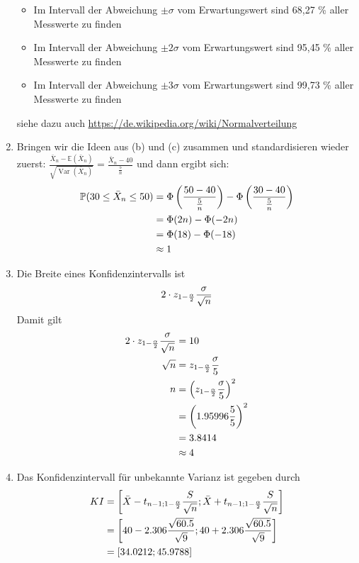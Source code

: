 \documentclass{article}
\newcommand{\E}{\mathbb{E}}
\DeclareMathOperator{\Var}{Var}
\begin{document}
\begin{enumerate}[label=(\alph*)]
\begin{itemize}
			\item Im Intervall der Abweichung $\pm\sigma$ vom Erwartungswert sind 68,27 \% aller Messwerte zu finden
			\item Im Intervall der Abweichung $\pm2\sigma$ vom Erwartungswert sind 95,45 \% aller Messwerte zu finden
			\item Im Intervall der Abweichung $\pm3\sigma$ vom Erwartungswert sind 99,73 \% aller Messwerte zu finden
		\end{itemize}
		siehe dazu auch \url{https://de.wikipedia.org/wiki/Normalverteilung}
		\item Bringen wir die Ideen aus (b) und (c) zusammen und standardisieren wieder zuerst: $\frac{\bar{X}_n-\E(\bar{X}_n)}{\sqrt{\Var(\bar{X}_n)}} = \frac{\bar{X}_n-40}{\frac{5}{n}}$ und dann ergibt sich:
		\begin{align}
			\mathbb{P}(30 \le \bar{X}_n \le 50) &= \Phi\left(\frac{50-40}{\frac{5}{n}}\right) - \Phi\left(\frac{30-40}{\frac{5}{n}}\right) \notag \\
			&= \Phi(2n) - \Phi(-2n) \notag \\
			&= \Phi(18) - \Phi(-18) \notag \\
			&\approx 1 \notag
		\end{align}
		\item Die Breite eines Konfidenzintervalls ist
		\begin{align}
			2\cdot z_{1-\frac{\alpha}{2}}\frac{\sigma}{\sqrt{n}} \notag
		\end{align}
		Damit gilt
		\begin{align}
			2\cdot z_{1-\frac{\alpha}{2}}\frac{\sigma}{\sqrt{n}} &= 10 \notag \\
			\sqrt{n} &= z_{1-\frac{\alpha}{2}}\frac{\sigma}{5} \notag \\
			n &= \left(z_{1-\frac{\alpha}{2}}\frac{\sigma}{5}\right)^2 \notag \\
			&= \left(1.95996\frac{5}{5}\right)^2 \notag \\
			&= 3.8414 \notag \\
			&\approx 4 \notag
		\end{align}
		\item Das Konfidenzintervall für unbekannte Varianz ist gegeben durch
		\begin{align}
			KI &= \left[\bar{X} - t_{n-1;1-\frac{\alpha}{2}}\frac{S}{\sqrt{n}}; \bar{X} + t_{n-1;1-\frac{\alpha}{2}}\frac{S}{\sqrt{n}}\right] \notag \\
			&= \left[40 - 2.306\frac{\sqrt{60.5}}{\sqrt{9}}; 40 + 2.306\frac{\sqrt{60.5}}{\sqrt{9}}\right] \notag \\
			&= [34.0212;45.9788] \notag
		\end{align}
	\end{enumerate}
\end{document}
